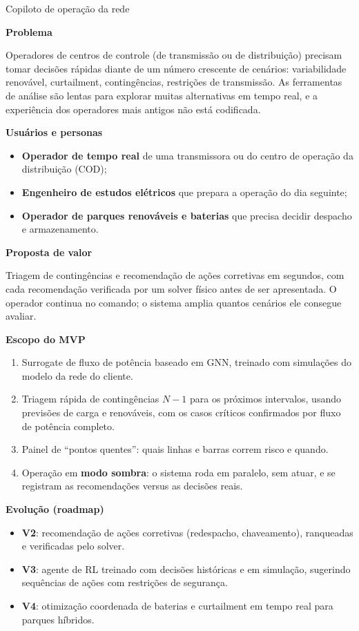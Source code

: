 \documentclass[10pt,a4paper,oneside]{article}
\newcommand{\prodsec}[1]{\par\medskip\noindent\textbf{\color{prodcolor}#1}\par\smallskip}
\begin{document}
\begin{produto}{Copiloto de operação da rede}

\prodsec{Problema}
Operadores de centros de controle (de transmissão ou de distribuição)
precisam tomar decisões rápidas diante de um número crescente de cenários:
variabilidade renovável, curtailment, contingências, restrições de
transmissão. As ferramentas de análise são lentas para explorar muitas
alternativas em tempo real, e a experiência dos operadores mais antigos não
está codificada.

\prodsec{Usuários e personas}
\begin{itemize}
  \item \textbf{Operador de tempo real} de uma transmissora ou do centro de
    operação da distribuição (COD);
  \item \textbf{Engenheiro de estudos elétricos} que prepara a operação do dia
    seguinte;
  \item \textbf{Operador de parques renováveis e baterias} que precisa decidir
    despacho e armazenamento.
\end{itemize}

\prodsec{Proposta de valor}
Triagem de contingências e recomendação de ações corretivas em segundos, com
cada recomendação verificada por um solver físico antes de ser apresentada.
O operador continua no comando; o sistema amplia quantos cenários ele
consegue avaliar.

\prodsec{Escopo do MVP}
\begin{enumerate}
  \item Surrogate de fluxo de potência baseado em GNN, treinado com
    simulações do modelo da rede do cliente.
  \item Triagem rápida de contingências $N-1$ para os próximos intervalos,
    usando previsões de carga e renováveis, com os casos críticos
    confirmados por fluxo de potência completo.
  \item Painel de ``pontos quentes'': quais linhas e barras correm risco e
    quando.
  \item Operação em \textbf{modo sombra}: o sistema roda em paralelo, sem atuar,
    e se registram as recomendações versus as decisões reais.
\end{enumerate}

\prodsec{Evolução (roadmap)}
\begin{itemize}
  \item \textbf{V2}: recomendação de ações corretivas (redespacho,
    chaveamento), ranqueadas e verificadas pelo solver.
  \item \textbf{V3}: agente de RL treinado com decisões históricas e em
    simulação, sugerindo sequências de ações com restrições de segurança.
  \item \textbf{V4}: otimização coordenada de baterias e curtailment em
    tempo real para parques híbridos.
\end{itemize}


\end{produto}
\end{document}
